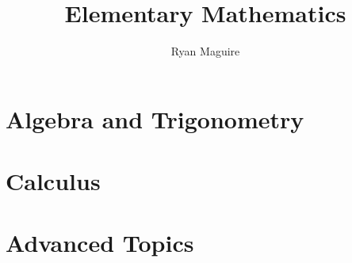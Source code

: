 \documentclass[oneside]{book}                                                 %
\title{Elementary Mathematics}                                                %
\author{Ryan Maguire}                                                         %
\date{\vspace{-5ex}}                                                          %
\begin{document}
    \maketitle
    \tableofcontents
    \listoffigures
    \listoftables
    \clearpage
    \part{Algebra and Trigonometry}
        
        
        
    \part{Calculus}
        
        
        
        
    \part{Advanced Topics}
        
        
        
        

    \printglossary[type=\acronymtype]
    \clearpage
    \printglossary[style=long]
\end{document}
